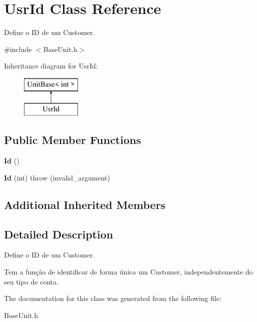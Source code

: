 \hypertarget{classUsrId}{\section{Usr\-Id Class Reference}
\label{classUsrId}
}


Define o I\-D de um Customer.  




{\ttfamily \#include $<$Base\-Unit.\-h$>$}

Inheritance diagram for Usr\-Id\-:\begin{figure}[H]
\begin{center}
\leavevmode
\includegraphics[height=2.000000cm]{classUsrId}
\end{center}
\end{figure}
\subsection*{Public Member Functions}
\begin{DoxyCompactItemize}
\item 
\hypertarget{classUsrId_a90f49e923fb187c5330f71a75cd643a2}{{\bfseries Id} ()}\label{classUsrId_a90f49e923fb187c5330f71a75cd643a2}

\item 
\hypertarget{classUsrId_a492418ee700c6a34d1dda28054b369b0}{{\bfseries Id} (int)  throw (invalid\-\_\-argument)}\label{classUsrId_a492418ee700c6a34d1dda28054b369b0}

\end{DoxyCompactItemize}
\subsection*{Additional Inherited Members}


\subsection{Detailed Description}
Define o I\-D de um Customer. 

Tem a função de identificar de forma única um Customer, independentemente do seu tipo de conta. 

The documentation for this class was generated from the following file\-:\begin{DoxyCompactItemize}
\item 
Base\-Unit.\-h\end{DoxyCompactItemize}
